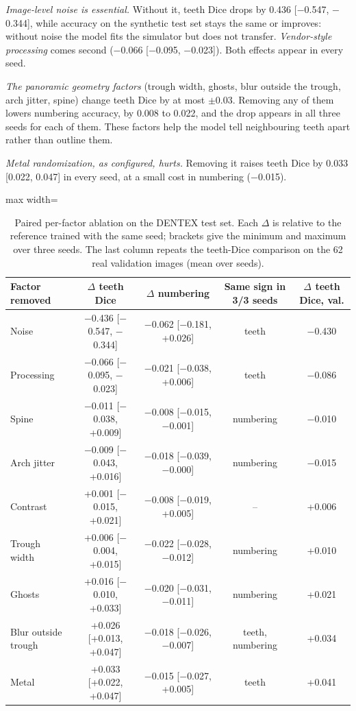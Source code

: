 \documentclass[preprint,12pt]{elsarticle}
\begin{document}
\emph{Image-level noise is essential.} Without it, teeth Dice drops by 0.436 [$-$0.547, $-$0.344], while accuracy on
the synthetic test set stays the same or improves: without noise the model fits the simulator but does not transfer.
\emph{Vendor-style processing} comes second ($-$0.066 [$-$0.095, $-$0.023]). Both effects appear in every seed.

\emph{The panoramic geometry factors} (trough width, ghosts, blur outside the trough, arch jitter, spine) change teeth
Dice by at most $\pm$0.03. Removing any of them lowers numbering accuracy, by 0.008 to 0.022, and the drop appears in all
three seeds for each of them. These factors help the model tell neighbouring teeth apart rather than outline them.

\emph{Metal randomization, as configured, hurts.} Removing it raises teeth Dice by 0.033 [0.022, 0.047] in every seed,
at a small cost in numbering ($-$0.015).

\begin{table}[t]
\centering\small
\caption{Paired per-factor ablation on the DENTEX test set. Each $\Delta$ is relative to the reference trained with the
same seed; brackets give the minimum and maximum over three seeds. The last column repeats the teeth-Dice comparison on
the 62 real validation images (mean over seeds).}
\label{tab:abl}
\begin{adjustbox}{max width=\linewidth}
\begin{tabular}{@{}lcccc@{}}
\toprule
Factor removed & $\Delta$ teeth Dice & $\Delta$ numbering & Same sign in 3/3 seeds & $\Delta$ teeth Dice, val. \\
\midrule
Noise & $-$0.436 [$-$0.547, $-$0.344] & $-$0.062 [$-$0.181, +0.026] & teeth & $-$0.430 \\
Processing & $-$0.066 [$-$0.095, $-$0.023] & $-$0.021 [$-$0.038, +0.006] & teeth & $-$0.086 \\
Spine & $-$0.011 [$-$0.038, +0.009] & $-$0.008 [$-$0.015, $-$0.001] & numbering & $-$0.010 \\
Arch jitter & $-$0.009 [$-$0.043, +0.016] & $-$0.018 [$-$0.039, $-$0.000] & numbering & $-$0.015 \\
Contrast & +0.001 [$-$0.015, +0.021] & $-$0.008 [$-$0.019, +0.005] & -- & +0.006 \\
Trough width & +0.006 [$-$0.004, +0.015] & $-$0.022 [$-$0.028, $-$0.012] & numbering & +0.010 \\
Ghosts & +0.016 [$-$0.010, +0.033] & $-$0.020 [$-$0.031, $-$0.011] & numbering & +0.021 \\
Blur outside trough & +0.026 [+0.013, +0.047] & $-$0.018 [$-$0.026, $-$0.007] & teeth, numbering & +0.034 \\
Metal & +0.033 [+0.022, +0.047] & $-$0.015 [$-$0.027, +0.005] & teeth & +0.041 \\
\bottomrule
\end{tabular}
\end{adjustbox}
\end{table}
\end{document}
